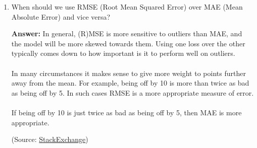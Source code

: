 \documentclass{article}
\newenvironment{QandA}{\begin{enumerate}[label=\arabic*.]}{\end{enumerate}}
\newenvironment{answer}{\par\normalfont \textbf{Answer:}}{}
\begin{document}
\begin{QandA}
    \item When should we use RMSE (Root Mean Squared Error) over MAE (Mean Absolute Error) and vice versa?
    \begin{answer}
        In general, (R)MSE is more sensitive to outliers than MAE, and the model will be more skewed towards them. Using one loss over the other typically comes down to how important is it to perform well on outliers.\\\\
         In many circumstances it makes sense to give more weight to points further away from the mean. For example, being off by 10 is more than twice as bad as being off by 5. In such cases RMSE is a more appropriate measure of error. \\\\
         If being off by 10 is just twice as bad as being off by 5, then MAE is more appropriate.

         (Source: \href{https://stats.stackexchange.com/questions/48267/mean-absolute-error-or-root-mean-squared-error}{StackExchange})
    \end{answer}


\end{QandA}
\end{document}
